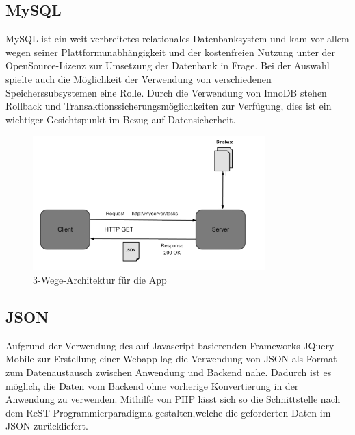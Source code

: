 \documentclass[10pt, conference, compsocconf]{IEEEtran}
\begin{document}
\subsection{MySQL}
MySQL ist ein weit verbreitetes relationales Datenbanksystem und kam vor allem wegen seiner Platt\-formunabh\"angigkeit und der kostenfreien Nutzung unter der OpenSource-Lizenz zur Umsetzung der Datenbank in Frage. 
Bei der Auswahl spielte auch die M\"oglichkeit der Verwendung von verschiedenen Speicherssubsystemen eine Rolle. 
Durch die Verwendung von InnoDB stehen Rollback und Transaktionssicherungsm\"oglichkeiten zur Verf\"ugung, dies ist ein wichtiger Gesichtspunkt im Bezug auf Datensicherheit.

\begin{figure}[t]
	\centering
	\includegraphics[width=0.8\textwidth]{./Bilder_Zeichnungen/Architektur_2.png}
	\caption{3-Wege-Architektur f\"ur die App}
	\label{fig:Architektur}
\end{figure}

\subsection{JSON}
Aufgrund der Verwendung des auf Javascript basierenden Frameworks JQuery-Mobile zur Erstellung einer Webapp lag die Verwendung von JSON als Format zum Datenaustausch zwischen Anwendung und Backend nahe. 
Dadurch ist es m\"oglich, die Daten vom Backend ohne vorherige Konvertierung in der Anwendung zu verwenden. 
Mithilfe von PHP l\"asst sich so die Schnittstelle nach dem ReST-Programmierparadigma gestalten,welche die geforderten Daten im JSON zur\"uckliefert. 
\end{document}

